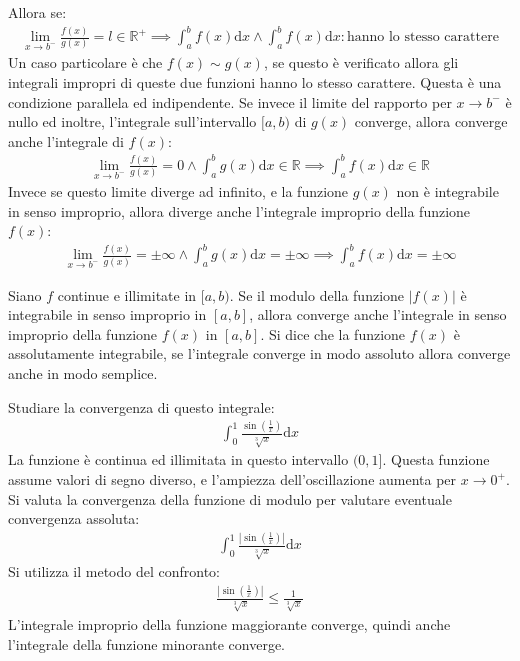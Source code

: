 \documentclass{article}
\numberwithin{equation}{subsection}
\begin{document}
Allora se:
\begin{gather*}
    \lim_{x\to b^-}\frac{f(x)}{g(x)}=l\in\mathbb{R}^+\implies \int_a^b f(x)\mathrm{d}x\land\int_a^b f(x)\mathrm{d}x:\mbox{hanno lo stesso carattere}
\end{gather*}
Un caso particolare è che $f(x)\sim g(x)$, se questo è verificato allora gli integrali impropri di queste due funzioni hanno lo stesso carattere. Questa è una condizione parallela ed indipendente. 
Se invece il limite del rapporto per $x\to b^-$ è nullo ed inoltre, l'integrale sull'intervallo $[a,b)$ di $g(x)$ converge, allora converge anche l'integrale di $f(x)$:
\begin{gather*}
    \displaystyle\lim_{x\to b^-}\frac{f(x)}{g(x)}=0\land\int_a^bg(x)\mathrm{d}x\in\mathbb{R}\implies\int_a^bf(x)\mathrm{d}x\in\mathbb{R}
\end{gather*}
Invece se questo limite diverge ad infinito, e la funzione $g(x)$ non è integrabile in senso improprio, allora diverge anche l'integrale improprio della funzione $f(x)$:
\begin{gather*}
    \displaystyle\lim_{x\to b^-}\frac{f(x)}{g(x)}=\pm\infty\land\displaystyle\int_a^bg(x)\mathrm{d}x=\pm\infty\implies\int_a^bf(x)\mathrm{d}x=\pm\infty
\end{gather*}



Siano $f$ continue e illimitate in $[a, b)$.  Se il modulo della funzione $|f(x)|$ è integrabile in senso improprio in $[a,b]$, allora converge anche l'integrale in senso improprio della funzione $f(x)$ in $[a,b]$. Si dice che la funzione $f(x)$ è assolutamente integrabile, se l'integrale converge in modo assoluto allora converge anche in modo semplice. 




Studiare la convergenza di questo integrale:
\begin{gather*}
    \displaystyle\int_0^1\frac{\sin\left(\frac{1}{x}\right)}{\sqrt[3]{x}}\mathrm{d}x
\end{gather*}
La funzione è continua ed illimitata in questo intervallo $(0,1]$. Questa funzione assume valori di segno diverso, e l'ampiezza dell'oscillazione aumenta per $x\to0^+$. Si valuta la convergenza della funzione di modulo per valutare eventuale convergenza assoluta:
\begin{gather*}
    \displaystyle\int_0^1\frac{\left|\sin\left(\frac{1}{x}\right)\right|}{\sqrt[3]{x}}\mathrm{d}x
\end{gather*}
Si utilizza il metodo del confronto:
\begin{gather*}
    \displaystyle\frac{\left|\sin\left(\frac{1}{x}\right)\right|}{\sqrt[3]{x}}\leq\frac{1}{\sqrt[3]{x}}
\end{gather*}
L'integrale improprio della funzione maggiorante converge, quindi anche l'integrale della funzione minorante converge. 
\end{document}
